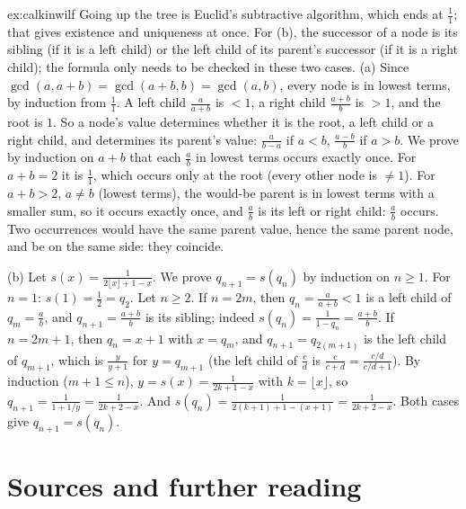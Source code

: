 \begin{solution}{ex:calkinwilf}
\idea Going up the tree is Euclid's subtractive algorithm, which ends at $\frac11$; that gives existence and uniqueness at once. For (b), the
successor of a node is its sibling (if it is a left child) or the left child of its parent's successor (if it is a right child); the
formula only needs to be checked in these two cases.
\writeup (a) Since $\gcd(a,a+b)=\gcd(a+b,b)=\gcd(a,b)$, every node is in lowest terms, by induction from $\frac11$. A left child $\frac a{a+b}$ is $<1$, a right
child $\frac{a+b}b$ is $>1$, and the root is $1$. So a node's value determines whether it is the root, a left child or a right child, and
determines its parent's value: $\frac a{b-a}$ if $a<b$, $\frac{a-b}b$ if $a>b$. We prove by induction on $a+b$ that each $\frac ab$ in lowest terms occurs exactly
once. For $a+b=2$ it is $\frac11$, which occurs only at the root (every other node is $\ne1$). For $a+b>2$, $a\ne b$ (lowest terms), the would-be
parent is in lowest terms with a smaller sum, so it occurs exactly once, and $\frac ab$ is its left or right child: $\frac ab$ occurs. Two
occurrences would have the same parent value, hence the same parent node, and be on the same side: they coincide.

(b) Let $s(x)=\frac1{2\lfloor x\rfloor+1-x}$. We prove $q_{n+1}=s(q_n)$ by induction on $n\ge1$. For $n=1$: $s(1)=\frac12=q_2$. Let $n\ge2$. If $n=2m$, then $q_n=\frac a{a+b}<1$
is a left child of $q_m=\frac ab$, and $q_{n+1}=\frac{a+b}b$ is its sibling; indeed $s(q_n)=\frac1{1-q_n}=\frac{a+b}b$. If $n=2m+1$, then $q_n=x+1$ with $x=q_m$, and $q_{n+1}=q_{2(m+1)}$ is
the left child of $q_{m+1}$, which is $\frac y{y+1}$ for $y=q_{m+1}$ (the left child of $\frac cd$ is $\frac c{c+d}=\frac{c/d}{c/d+1}$). By induction ($m+1\le n$),
$y=s(x)=\frac1{2k+1-x}$ with $k=\lfloor x\rfloor$, so $q_{n+1}=\frac1{1+1/y}=\frac1{2k+2-x}$. And $s(q_n)=\frac1{2(k+1)+1-(x+1)}=\frac1{2k+2-x}$. Both cases give $q_{n+1}=s(q_n)$.
\end{solution}

\section*{Sources and further reading}

